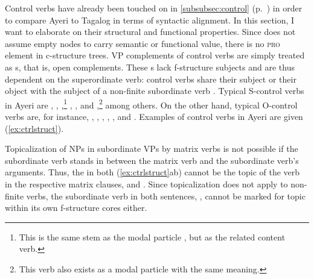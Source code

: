 Control verbs have already been touched on in \autoref{subsubsec:control}
(p.~\pageref{subsubsec:control}) in order to compare Ayeri to Tagalog in terms
of syntactic alignment. In this section, I want to elaborate on their
structural and functional properties. Since \Lfg{} does not assume empty nodes
to carry semantic or functional value, there is no \textsc{pro} element in
c-structure trees. VP complements of control verbs are simply treated as
\XCompl{}s, that is, open complements. These \XCompl{}s lack f-structure
subjects and are thus dependent on the superordinate verb: control verbs share
their subject or their object with the subject of a non-finite subordinate
verb \citep[289\psqq]{bresnan2016}.
Typical S-control verbs in Ayeri are
,
,
,\footnote{This is the same stem as the modal particle 
, but as the related content verb.}
,
, and
,\footnote{This verb also exists as a modal particle
 with the same meaning.}
among others. On the other hand, typical O-control verbs are, for instance,
,
,
,
,
, and
. Examples of control verbs in Ayeri
are given (\ref{ex:ctrlstruct}).

Topicalization of NPs in subordinate VPs by matrix verbs is not possible if the
subordinate verb stands in between the matrix verb and the subordinate verb's
arguments. Thus, the  in both
(\ref{ex:ctrlstruct}ab) cannot be the topic of the verb in the respective
matrix clauses,  and
. Since topicalization does not apply to
non-finite verbs, the subordinate verb in both sentences,
, cannot be marked for topic within its own
f-structure cores either.


